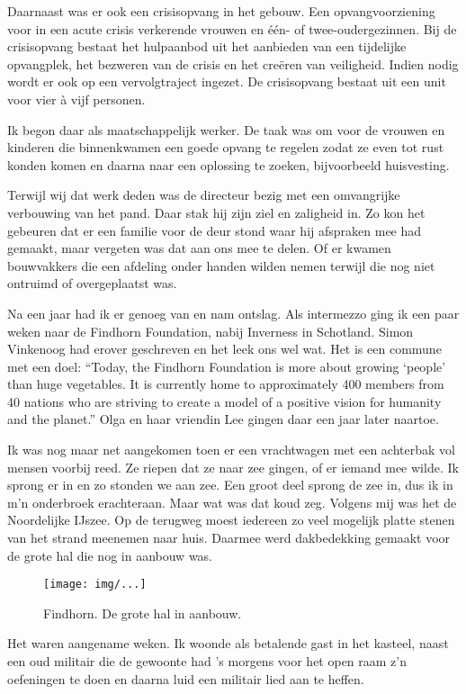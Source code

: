 \documentclass[10pt,twoside,openright]{memoir}
\begin{document}
Daarnaast was er ook een crisisopvang in het gebouw. Een opvangvoorziening voor in een acute crisis verkerende vrouwen en één- of twee-oudergezinnen. Bij de crisisopvang bestaat het hulpaanbod uit het aanbieden van een tijdelijke opvangplek, het bezweren van de crisis en het creëren van veiligheid. Indien nodig wordt er ook op een vervolgtraject ingezet. De crisisopvang bestaat uit een unit voor vier à vijf personen.

Ik begon daar als maatschappelijk werker. De taak was om voor de vrouwen en kinderen die binnenkwamen een goede opvang te regelen zodat ze even tot rust konden komen en daarna naar een oplossing te zoeken, bijvoorbeeld huisvesting. 

Terwijl wij dat werk deden was de directeur bezig met een omvangrijke verbouwing van het pand. Daar stak hij zijn ziel en zaligheid in. Zo kon het gebeuren dat er een familie voor de deur stond waar hij afspraken mee had gemaakt, maar vergeten was dat aan ons mee te delen. Of er kwamen bouwvakkers die een afdeling onder handen wilden nemen terwijl die nog niet ontruimd of overgeplaatst was. 

Na een jaar had ik er genoeg van en nam ontslag. Als intermezzo ging ik een paar weken naar de Findhorn Foundation, nabij Inverness in Schotland. Simon Vinkenoog had erover geschreven en het leek ons wel wat. Het is een commune met een doel: ``Today, the Findhorn Foundation is more about growing `people' than huge vegetables. It is currently home to approximately 400 members from 40 nations who are striving to create a model of a positive vision for humanity and the planet.'' Olga en haar vriendin Lee gingen daar een jaar later naartoe.

Ik was nog maar net aangekomen toen er een vrachtwagen met een achterbak vol mensen voorbij reed. Ze riepen dat ze naar zee gingen, of er iemand mee wilde. Ik sprong er in en zo stonden we aan zee. Een groot deel sprong de zee in, dus ik in m’n onderbroek erachteraan. Maar wat was dat koud zeg. Volgens mij was het de Noordelijke IJszee. Op de terugweg moest iedereen zo veel mogelijk platte stenen van het strand meenemen naar huis. Daarmee werd dakbedekking gemaakt voor de grote hal die nog in aanbouw was. 

\begin{figure}[t]
\texttt{[image: img/...]}
\caption{Findhorn. De grote hal in aanbouw.}
\end{figure}

Het waren aangename weken. Ik woonde als betalende gast in het kasteel, naast een oud militair die de gewoonte had ’s morgens voor het open raam z’n oefeningen te doen en daarna luid een militair lied aan te heffen. 
\end{document}
